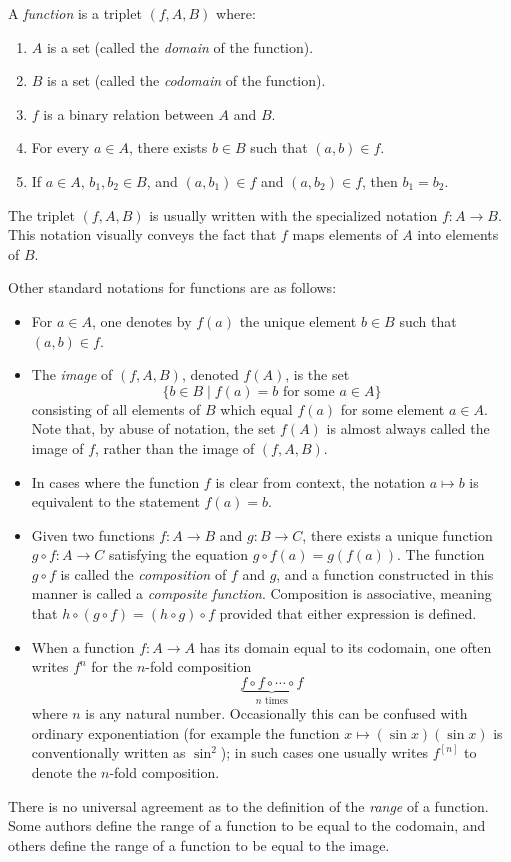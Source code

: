 \documentclass[12pt]{article}
\begin{document}
A \emph{function} is a triplet $(f,A,B)$ where:
\begin{enumerate}
\item $A$ is a set (called the \emph{domain} of the function).
\item $B$ is a set (called the \emph{codomain} of the function).
\item $f$ is a binary relation between $A$ and $B$.
\item For every $a \in A$, there exists $b \in B$ such that $(a,b) \in f$.
\item If $a \in A$, $b_1,b_2 \in B$, and $(a,b_1) \in f$ and $(a,b_2) \in f$, then $b_1 = b_2$.
\end{enumerate}
The triplet $(f,A,B)$ is usually written with the specialized notation $f\colon A \to B$. This notation visually conveys the fact that $f$ maps elements of $A$ into elements of $B$.

Other standard notations for functions are as follows:
\begin{itemize}
\item For $a \in A$, one denotes by $f(a)$ the unique element $b \in B$ such that $(a,b) \in f$.
\item The \emph{image} of $(f,A,B)$, denoted $f(A)$, is the set
$$
\{b \in B \mid f(a) = b \text{ for some } a \in A\}
$$
consisting of all elements of $B$ which equal $f(a)$ for some element $a \in A$. Note that, by abuse of notation, the set $f(A)$ is almost always called the image of $f$, rather than the image of $(f,A,B)$.
\item In cases where the function $f$ is clear from context, the notation $a \mapsto b$ is equivalent to the statement $f(a) = b$.
\item Given two functions $f\colon A \to B$ and $g\colon B \to C$, there exists a unique function $g \circ f\colon A \to C$ satisfying the equation $g \circ f(a) = g(f(a))$. The function $g \circ f$ is called the \emph{composition} of $f$ and $g$, and a function constructed in this manner is called a \emph{composite function}. Composition is associative, meaning that $h \circ (g \circ f) = (h \circ g) \circ f$ provided that either expression is defined.
\item When a function $f\colon A \to A$ has its domain equal to its codomain, one often writes $f^n$ for the $n$-fold composition
$$
\underbrace{f \circ f \circ \cdots \circ f}_{n\text{ times}}
$$
where $n$ is any natural number.  Occasionally this can be confused with ordinary exponentiation (for example the function $x\mapsto (\sin x)(\sin x)$ is conventionally written as $\sin^2$); in such cases one usually writes $f^{[n]}$ to denote the $n$-fold composition.
\end{itemize}
There is no universal agreement as to the definition of the \emph{range} of a function. Some authors define the range of a function to be equal to the codomain, and others define the range of a function to be equal to the image.
\end{document}
